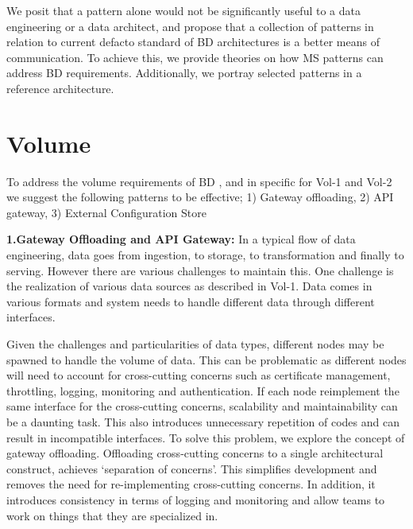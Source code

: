 \documentclass[a4paper,11pt,article,oneside]{memoir}
\begin{document}

We posit that a pattern alone would not be significantly useful to a data engineering or a data architect, and propose that a collection of patterns in relation to current defacto standard of BD architectures is a better means of communication. To achieve this, we provide theories on how MS patterns can address BD requirements. Additionally, we portray selected patterns in a reference architecture.


\section{Volume} \label{volumeSection}


To address the volume requirements of BD , and in specific for Vol-1 and Vol-2 we suggest the following patterns to be effective; 1) Gateway offloading, 2) API gateway, 3) External Configuration Store

\vspace{6px}
\textbf{1.Gateway Offloading and API Gateway:} In a typical flow of data engineering, data goes from ingestion, to storage, to transformation and finally to serving. However there are various challenges to maintain this. One challenge is the realization of various data sources as described in Vol-1. Data comes in various formats and system needs to handle different data through different interfaces. 


Given the challenges and particularities of data types, different nodes may be spawned to handle the volume of data. This can be problematic as different nodes will need to account for cross-cutting concerns such as certificate management, throttling, logging, monitoring and authentication. If each node reimplement the same interface for the cross-cutting concerns, scalability and maintainability can be a daunting task. This also introduces unnecessary repetition of codes and can result in incompatible interfaces. To solve this problem, we explore the concept of gateway offloading. Offloading cross-cutting concerns to a single architectural construct, achieves `separation of concerns'. This simplifies development and removes the need for re-implementing cross-cutting concerns. In addition, it introduces consistency in terms of logging and monitoring and allow teams to work on things that they are specialized in.
\end{document}
